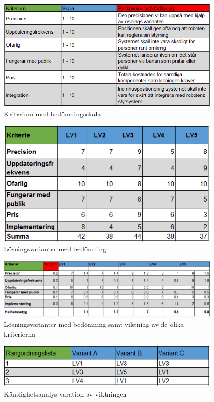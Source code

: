 \documentclass[11pt, a4paper]{report}
\begin{document}
\begin{figure}[H]
	\begin{center}
		\includegraphics [width=12cm,angle=0]{bedomningskala.png}
		\caption{Kriterium med bedömningsskala }
		\label{fig:bedomningskala}
	\end{center}
\end{figure}

\begin{figure}[H]
	\begin{center}
		\includegraphics [width=12cm,angle=0]{bedomningavkrit.png}
		\caption{Lösningsvarianter med bedömning}
		\label{fig:medbedomning}
	\end{center}
\end{figure}

\begin{figure}[H]
	\begin{center}
		\includegraphics [width=12cm,angle=0]{bedomningvikt.png}
		\caption{Lösningsvarianter med bedömning samt viktning av de olika kriterierna}
		\label{fig:bedomningvikt}
	\end{center}
\end{figure}

\begin{figure}[H]
	\begin{center}
		\includegraphics [width=12cm,angle=0]{rangordning.png}
		\caption{Känslighetsanalys varation av viktningen}
		\label{fig:rangordning}
	\end{center}
\end{figure}
\end{document}
